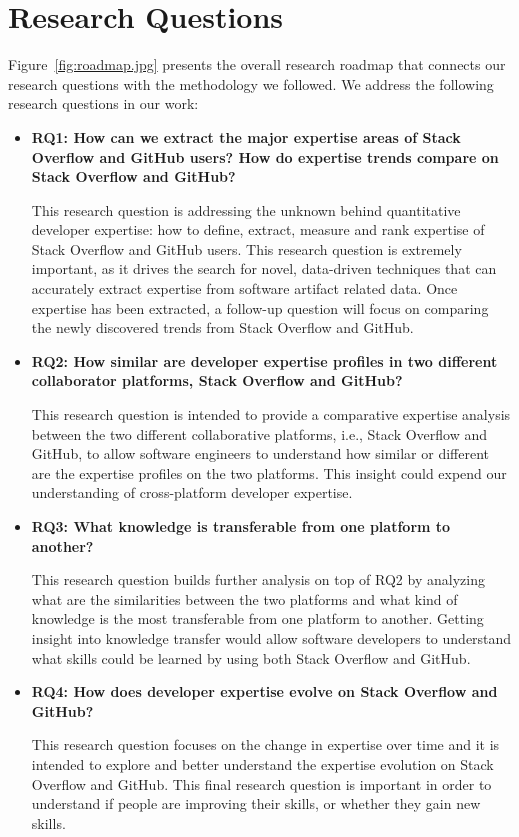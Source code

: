     \section{Research Questions\label{sec:RQs}}

        Figure~\ref{fig:roadmap.jpg} presents the overall research roadmap that connects our research questions with the methodology we followed. We address the following research questions in our work:
       
        \begin{itemize}
            \item \textbf{RQ1: How can we extract the major expertise areas of Stack Overflow and GitHub users? How do expertise trends compare on Stack Overflow and GitHub?}
            
            This research question is addressing the unknown behind quantitative developer expertise: how to define, extract, measure and rank expertise of Stack Overflow and GitHub users. This research question is extremely important, as it drives the search for novel, data-driven techniques that can accurately extract expertise from software artifact related data. Once expertise has been extracted, a follow-up question will focus on comparing the newly discovered trends from Stack Overflow and GitHub.
            
            \item \textbf{RQ2: How similar are developer expertise profiles in two different collaborator platforms, Stack Overflow and GitHub?}
            
            This research question is intended to provide a comparative expertise analysis between the two different collaborative platforms, i.e., Stack Overflow and GitHub, to allow software engineers to understand how similar or different are the expertise profiles on the two platforms. This insight could expend our understanding of cross-platform developer expertise.
            
            \item \textbf{RQ3: What knowledge is transferable from one platform to another?}
            
            This research question builds further analysis on top of RQ2 by analyzing what are the similarities between the two platforms and what kind of knowledge is the most transferable from one platform to another. Getting insight into knowledge transfer would allow software developers to understand what skills could be learned by using both Stack Overflow and GitHub.
            
            \item \textbf{RQ4: How does developer expertise evolve on Stack Overflow and GitHub?}
            
            This research question focuses on the change in expertise over time and it is intended to explore and better understand the expertise evolution on Stack Overflow and GitHub. This final research question is important in order to understand if people are improving their skills, or whether they gain new skills.
        \end{itemize}
        
